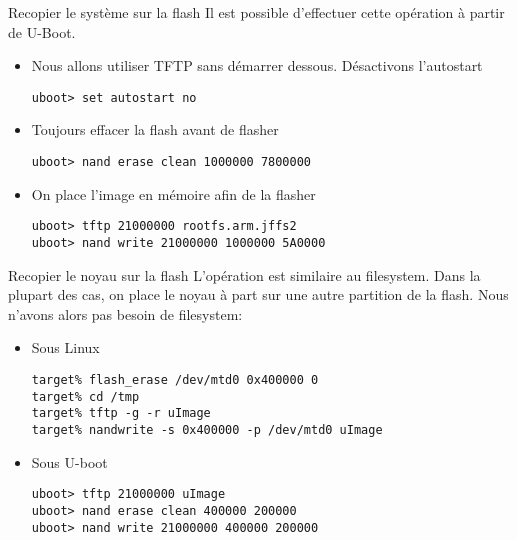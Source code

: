 \begin{frame}[fragile=singleslide]{Recopier le système sur la flash}
  Il est possible d'effectuer cette opération à partir de U-Boot.
  \begin{itemize} 
  \item Nous allons utiliser TFTP sans démarrer dessous. Désactivons l'autostart
    \begin{lstlisting} 
uboot> set autostart no
    \end{lstlisting} 
  \item Toujours effacer la flash avant de flasher
    \begin{lstlisting} 
uboot> nand erase clean 1000000 7800000
    \end{lstlisting} 
  \item On place l'image en mémoire afin de la flasher
    \begin{lstlisting} 
uboot> tftp 21000000 rootfs.arm.jffs2
uboot> nand write 21000000 1000000 5A0000
    \end{lstlisting} 
  \end{itemize}
\end{frame}

\begin{frame}[fragile=singleslide]{Recopier le noyau sur la flash}
  L'opération est similaire au filesystem. Dans la plupart des cas, on
  place le  noyau à  part sur  une autre partition  de la  flash. Nous
  n'avons alors pas besoin de filesystem:
  \begin{itemize} 
  \item Sous Linux
    \begin{lstlisting}
target% flash_erase /dev/mtd0 0x400000 0
target% cd /tmp
target% tftp -g -r uImage
target% nandwrite -s 0x400000 -p /dev/mtd0 uImage 
    \end{lstlisting}
  \item Sous U-boot
    \begin{lstlisting} 
uboot> tftp 21000000 uImage
uboot> nand erase clean 400000 200000
uboot> nand write 21000000 400000 200000
    \end{lstlisting} 
  \end{itemize}
\end{frame}


